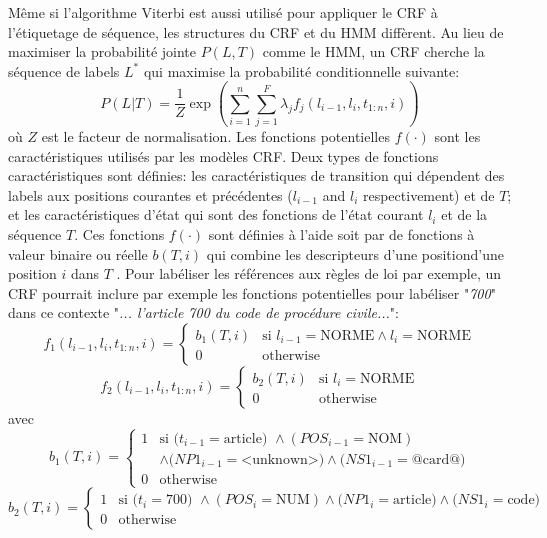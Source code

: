 Même si l'algorithme Viterbi est aussi utilisé pour appliquer le CRF à l'étiquetage de séquence, les structures du CRF et du HMM diffèrent. Au lieu de maximiser la probabilité jointe $ P(L, T)$ comme le HMM, un CRF \citep{lafferty2001crfie} cherche la séquence de labels $L^*$ qui maximise la probabilité conditionnelle suivante: $$P(L|T) = \frac{1}{Z}\exp \left(\sum\limits_{i=1}^n\sum\limits_{j=1}^F \lambda_j f_j(l_{i-1},l_i,t_{1:n},i)\right)$$ où $Z$ est le facteur de normalisation. Les fonctions potentielles $f(\cdot)$ sont les caractéristiques utilisés par les modèles CRF. Deux types de fonctions caractéristiques sont définies: les caractéristiques de transition qui dépendent des labels aux positions courantes et précédentes ($l_{i-1}$ and $ l_{i}$ respectivement) et de $T$; et les caractéristiques d'état qui sont des fonctions de l'état courant $ l_{i} $ et de la séquence $ T $. Ces fonctions $f(\cdot)$ sont définies à l'aide soit par de fonctions à valeur binaire ou réelle $b(T,i)$ qui combine les descripteurs d'une positiond'une position $i$ dans $T$ \citep{Wallach2004crfintro}. Pour labéliser les références aux règles de loi par exemple, un CRF pourrait inclure par exemple les fonctions potentielles pour labéliser "\textit{700}" dans ce contexte "\textit{... l'article 700 du code de procédure civile...}":
{\scriptsize
\[f_1(l_{i-1},l_i,t_{1:n},i) = \left\lbrace \begin{array}{ll}
b_1(T,i) & \text{si } l_{i-1} = \text{NORME} \wedge l_i = \text{NORME} \\
0 & \text{otherwise}
\end{array} \right.\]
\[f_2(l_{i-1},l_i,t_{1:n},i) = \left\lbrace \begin{array}{ll}
b_2(T,i) & \text{si }l_i = \text{NORME} \\
0 & \text{otherwise}
\end{array} \right.\]
avec
\[b_1(T,i) = \left\lbrace \begin{array}{ll}
1 & \text{si } (t_{i-1} =\text{article) }\wedge (POS_{i-1}=\text{NOM}) \\&  \wedge  (NP1_{i-1}=\text{<unknown>)} \wedge (NS1_{i-1}=\text{@card@)} \\
0 & \text{otherwise} 
\end{array} \right.\]
\[b_2(T,i) = \left\lbrace \begin{array}{ll}
1 & \text{si } (t_i =\text{700) }\wedge (POS_i=\text{NUM})  \wedge (NP1_i=\text{article)} 
\wedge (NS1_i=\text{code)} \\
0 & \text{otherwise}
\end{array} \right.\]
}
